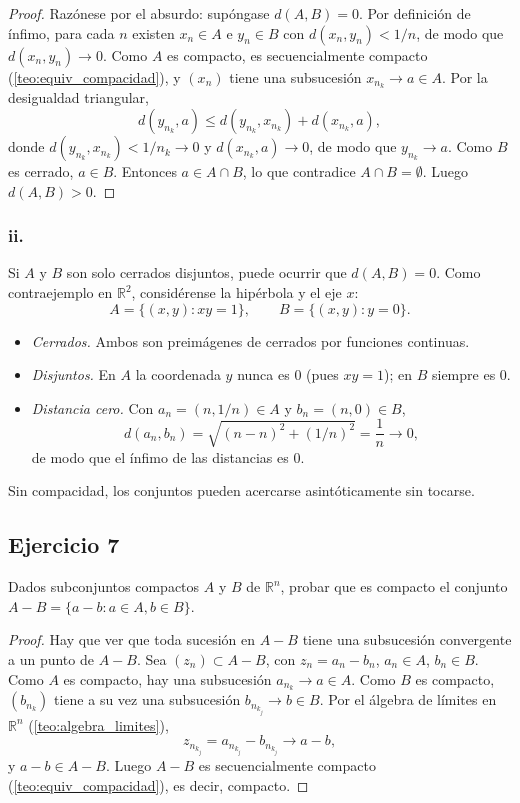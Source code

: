 \documentclass[11pt, a4paper]{article}
\begin{document}
\begin{proof}
Razónese por el absurdo: supóngase $d(A, B) = 0$. Por definición de ínfimo, para cada $n$ existen
$x_n \in A$ e $y_n \in B$ con $d(x_n, y_n) < 1/n$, de modo que $d(x_n, y_n) \to 0$. Como $A$ es compacto,
es secuencialmente compacto (\ref{teo:equiv_compacidad}), y $(x_n)$ tiene una subsucesión
$x_{n_k} \to a \in A$. Por la
desigualdad triangular,
$$ d(y_{n_k}, a) \le d(y_{n_k}, x_{n_k}) + d(x_{n_k}, a), $$
donde $d(y_{n_k}, x_{n_k}) < 1/n_k \to 0$ y $d(x_{n_k}, a) \to 0$, de modo que $y_{n_k} \to a$. Como
$B$ es cerrado, $a \in B$. Entonces $a \in A \cap B$, lo que contradice $A \cap B = \emptyset$. Luego
$d(A, B) > 0$.
\end{proof}

\subsubsection*{ii.}
Si $A$ y $B$ son solo cerrados disjuntos, puede ocurrir que $d(A, B) = 0$. Como contraejemplo en
$\mathbb{R}^2$, considérense la hipérbola y el eje $x$:
$$ A = \{ (x, y) : xy = 1 \}, \qquad B = \{ (x, y) : y = 0 \}. $$
\begin{itemize}
    \item \textit{Cerrados.} Ambos son preimágenes de cerrados por funciones continuas.
    \item \textit{Disjuntos.} En $A$ la coordenada $y$ nunca es $0$ (pues $xy = 1$); en $B$ siempre
    es $0$.
    \item \textit{Distancia cero.} Con $a_n = (n, 1/n) \in A$ y $b_n = (n, 0) \in B$,
    $$ d(a_n, b_n) = \sqrt{(n-n)^2 + (1/n)^2} = \frac{1}{n} \to 0, $$
    de modo que el ínfimo de las distancias es $0$.
\end{itemize}
Sin compacidad, los conjuntos pueden acercarse asintóticamente sin tocarse.

\subsection*{Ejercicio 7}

Dados subconjuntos compactos $A$ y $B$ de $\mathbb{R}^n$, probar que es compacto el conjunto
$A - B = \{a - b : a \in A, b \in B\}$.

\begin{proof}
Hay que ver que toda sucesión en $A - B$ tiene una subsucesión convergente a un punto de $A - B$.
Sea $(z_n) \subset A - B$, con $z_n = a_n - b_n$, $a_n \in A$, $b_n \in B$. Como $A$ es compacto, hay
una subsucesión $a_{n_k} \to a \in A$. Como $B$ es compacto, $(b_{n_k})$ tiene a su vez una
subsucesión $b_{n_{k_j}} \to b \in B$. Por el álgebra de límites en $\mathbb{R}^n$
(\ref{teo:algebra_limites}),
$$ z_{n_{k_j}} = a_{n_{k_j}} - b_{n_{k_j}} \to a - b, $$
y $a - b \in A - B$. Luego $A - B$ es secuencialmente compacto (\ref{teo:equiv_compacidad}), es decir, compacto.
\end{proof}
\end{document}
